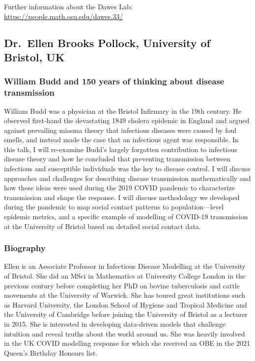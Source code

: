 \documentclass[12pt,a4paper]{article}
\begin{document}
Further information about the Dawes Lab: \href{https://people.math.osu.edu/dawes.33/}{https://people.math.osu.edu/dawes.33/}

\subsection{Dr.~Ellen Brooks Pollock, University of Bristol, UK}

\subsubsection{William Budd and 150 years of thinking about disease transmission}

William Budd was a physician at the Bristol Infirmary in the 19th century. He observed first-hand the devastating 1849 cholera epidemic in England and argued against prevailing miasma theory that infectious diseases were caused by foul smells, and instead made the case that an infectious agent was responsible. In this talk, I will re-examine Budd’s largely forgotten contribution to infectious disease theory and how he concluded that preventing transmission between infectious and susceptible individuals was the key to disease control. I will discuss approaches and challenges for describing disease transmission mathematically and how these ideas were used during the 2019 COVID pandemic to characterize transmission and shape the response. I will discuss methodology we developed during the pandemic to map social contact patterns to population—level epidemic metrics, and a specific example of modelling of COVID-19 transmission at the University of Bristol based on detailed social contact data.   
\subsubsection{Biography}

Ellen is an Associate Professor in Infectious Disease Modelling at the University of Bristol. She did an MSci in Mathematics at University College London in the previous century before completing her PhD on bovine tuberculosis and cattle movements at the University of Warwick. She has toured great institutions such as Harvard University, the London School of Hygiene and Tropical Medicine and the University of Cambridge before joining the University of Bristol as a lecturer in 2015. She is interested in developing data-driven models that challenge intuition and reveal truths about the world around us. She was heavily involved in the UK COVID modelling response for which she received an OBE in the 2021 Queen’s Birthday Honours list.  
\end{document}
